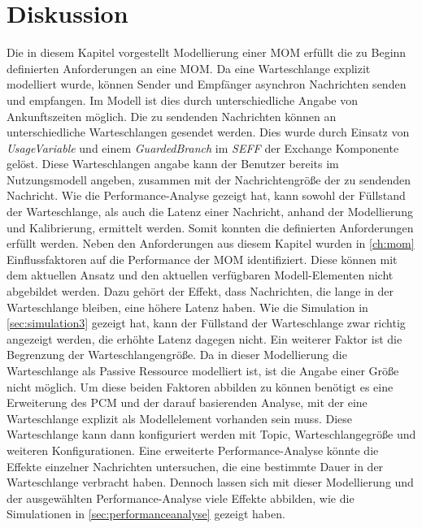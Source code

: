 \section{Diskussion}
Die in diesem Kapitel vorgestellt Modellierung einer MOM erfüllt die zu Beginn definierten Anforderungen an eine MOM. Da eine Warteschlange explizit modelliert wurde, können Sender und Empfänger asynchron Nachrichten senden und empfangen. Im Modell ist dies durch unterschiedliche Angabe von Ankunftszeiten möglich. Die zu sendenden Nachrichten können an unterschiedliche Warteschlangen gesendet werden. Dies wurde durch Einsatz von \emph{UsageVariable} und einem \emph{GuardedBranch} im \emph{SEFF} der Exchange Komponente gelöst. Diese Warteschlangen angabe kann der Benutzer bereits im Nutzungsmodell angeben, zusammen mit der Nachrichtengröße der zu sendenden Nachricht. Wie die Performance-Analyse gezeigt hat, kann sowohl der Füllstand der Warteschlange, als auch die Latenz einer Nachricht, anhand der Modellierung und Kalibrierung, ermittelt werden. Somit konnten die definierten Anforderungen erfüllt werden. Neben den Anforderungen aus diesem Kapitel wurden in \autoref{ch:mom} Einflussfaktoren auf die Performance der MOM identifiziert. Diese können mit dem aktuellen Ansatz und den aktuellen verfügbaren Modell-Elementen nicht abgebildet werden. Dazu gehört der Effekt, dass Nachrichten, die lange in der Warteschlange bleiben, eine höhere Latenz haben. Wie die Simulation in \autoref{sec:simulation3} gezeigt hat, kann der Füllstand der Warteschlange zwar richtig angezeigt werden, die erhöhte Latenz dagegen nicht. Ein weiterer Faktor ist die Begrenzung der Warteschlangengröße. Da in dieser Modellierung die Warteschlange als Passive Ressource modelliert ist, ist die Angabe einer Größe nicht möglich. Um diese beiden Faktoren abbilden zu können benötigt es eine Erweiterung des PCM und der darauf basierenden Analyse, mit der eine Warteschlange explizit als Modellelement vorhanden sein muss. Diese Warteschlange kann dann konfiguriert werden mit Topic, Warteschlangegröße und weiteren Konfigurationen. Eine erweiterte Performance-Analyse könnte die Effekte einzelner Nachrichten untersuchen, die eine bestimmte Dauer in der Warteschlange verbracht haben. Dennoch lassen sich mit dieser Modellierung und der ausgewählten Performance-Analyse viele Effekte abbilden, wie die Simulationen in \autoref{sec:performanceanalyse} gezeigt haben.

